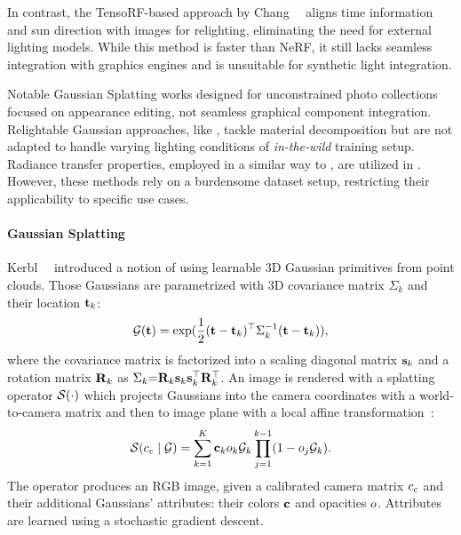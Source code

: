     In contrast, the TensoRF-based approach by
    Chang~\etal~\cite{chang2024srtensorf} aligns time information and sun
    direction with images for relighting, eliminating the need for external
    lighting models.
    While this method is faster than NeRF, it still lacks seamless integration
    with graphics engines and is unsuitable for synthetic light integration.

    Notable Gaussian Splatting works designed for unconstrained photo collections
    \cite{kerbl20233d, dahmani2024swagsplattingwildimages, zhang2024gaussian,
      xu2024wildgs, wang2024wegs} focused on appearance editing, not seamless
    graphical component integration.
    Relightable Gaussian approaches, like \cite{gao2023relightable, liang2024gs,
      shi2023gir}, tackle material decomposition but are not adapted to handle
    varying lighting conditions of \textit{in-the-wild} training setup.
    Radiance transfer properties, employed in a similar way to \lumigauss, are
    utilized in \cite{zhang2024prtgaussianefficientrelightingusing,
      saito2024relightable}.
    However, these methods rely on a burdensome dataset setup, restricting their
    applicability to specific use cases.

  \paragraph{Gaussian Splatting}
    Kerbl~\etal~\cite{kerbl20233d} introduced a notion of using learnable 3D
    Gaussian primitives from point clouds.
    Those Gaussians are parametrized with 3D covariance matrix $\Sigma_k$ and their location $\mathbf{t}_k$:
    \begin{equation}
      \mathcal{G}(\mathbf{t}) = \exp(\frac{1}{2}(\mathbf{t} - \mathbf{t}_k)^\top\Sigma_k^{-1}(\mathbf{t} - \mathbf{t}_k)),
    \end{equation}
    where the covariance matrix is factorized into a scaling diagonal matrix $\mathbf{s}_k$ and a rotation matrix $\mathbf{R}_k$ as $\Sigma_k{=}\mathbf{R}_k\mathbf{s}_k\mathbf{s}_k^\top\mathbf{R}_k^\top$. An image is rendered with a splatting operator $\mathcal{S}(\cdot)$ which projects Gaussians into the camera coordinates with a world-to-camera matrix and then to image plane with a local affine transformation~\cite{zwicker2001ewa}:
    \begin{equation}
      \label{eq:lumigauss-splatting-op}
      \mathcal{S}(c_c\;|\;\mathcal{G}) = \sum_{k=1}^K\mathbf{c}_ko_k\mathcal{G}_k\prod^{k-1}_{j=1}(1 - o_j \mathcal{G}_k).
    \end{equation}
    The operator produces an RGB image, given a calibrated camera matrix
    $c_c$ and their additional Gaussians' attributes: their colors
    $\mathbf{c}$ and opacities $o$.
    Attributes are learned using a stochastic gradient descent.

